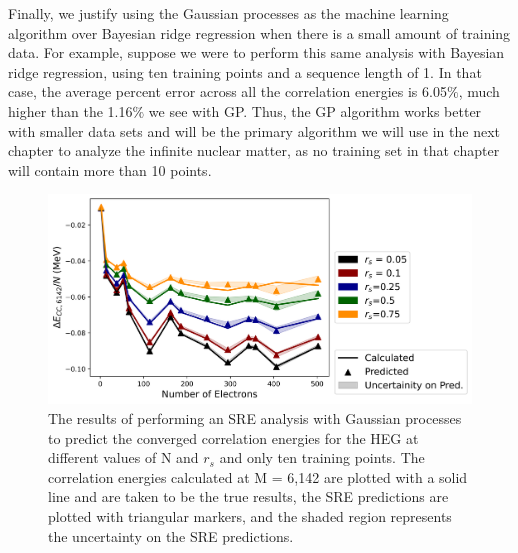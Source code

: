 Finally, we justify using the Gaussian processes as the machine learning algorithm over Bayesian ridge regression when there is a small amount of training data. For example, suppose we were to perform this same analysis with Bayesian ridge regression, using ten training points and a sequence length of 1. In that case, the average percent error across all the correlation energies is 6.05$\%$, much higher than the 1.16$\%$ we see with GP. Thus, the GP algorithm works better with smaller data sets and will be the primary algorithm we will use in the next chapter to analyze the infinite nuclear matter, as no training set in that chapter will contain more than 10 points.

\begin{figure}
    \centering
    \includegraphics[scale=0.75]{Images/Chapter7/ElectronGas/BRR_EG_MSU_uncertainities_GP_2.png}
    \caption{The results of performing an SRE analysis with Gaussian processes to predict the converged correlation energies for the HEG at different values of N and $r_s$ and only ten training points.  The correlation energies calculated at M = 6,142 are plotted with a solid line and are taken to be the true results, the SRE predictions are plotted with triangular markers, and the shaded region represents the uncertainty on the SRE predictions.}
    \label{fig:gp_10_points}
\end{figure}
